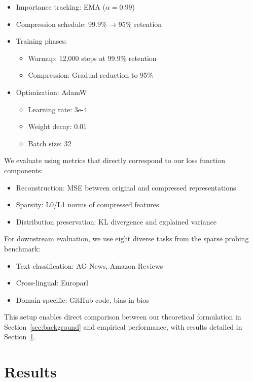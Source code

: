 \documentclass{article} %
\begin{document}
\begin{itemize}
    \item Importance tracking: EMA ($\alpha=0.99$)
    \item Compression schedule: 99.9\% → 95\% retention
    \item Training phases:
        \begin{itemize}
            \item Warmup: 12,000 steps at 99.9\% retention
            \item Compression: Gradual reduction to 95\%
        \end{itemize}
    \item Optimization: AdamW \cite{loshchilov2017adamw}
        \begin{itemize}
            \item Learning rate: 3e-4
            \item Weight decay: 0.01
            \item Batch size: 32
        \end{itemize}
\end{itemize}

We evaluate using metrics that directly correspond to our loss function components:

\begin{itemize}
    \item Reconstruction: MSE between original and compressed representations
    \item Sparsity: L0/L1 norms of compressed features
    \item Distribution preservation: KL divergence and explained variance
\end{itemize}

For downstream evaluation, we use eight diverse tasks from the sparse probing benchmark:
\begin{itemize}
    \item Text classification: AG News, Amazon Reviews
    \item Cross-lingual: Europarl
    \item Domain-specific: GitHub code, bias-in-bios
\end{itemize}

This setup enables direct comparison between our theoretical formulation in Section~\ref{sec:background} and empirical performance, with results detailed in Section~\ref{sec:results}.

\section{Results}
\label{sec:results}
\end{document}
